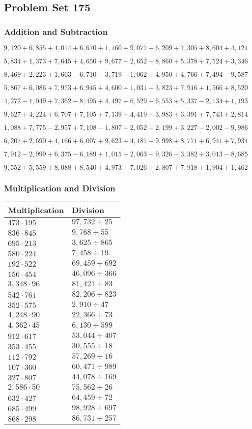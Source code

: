 \hypertarget{problem-set-175}{%
\subsection{Problem Set 175}\label{problem-set-175}}

\hypertarget{addition-and-subtraction}{%
\subsubsection{Addition and
Subtraction}\label{addition-and-subtraction}}

\(9,120+6,855+4,014+6,670+1,160+9,077+6,209+7,305+8,604+4,121\)

\(5,834+1,373+7,645+4,650+9,677+2,652+8,860+5,378+7,524+3,346\)

\(8,469+2,223+1,663-6,710-3,719-1,062+4,950+4,766+7,494-9,587\)

\(5,867+6,086+7,973+6,945+4,600+1,031+3,823+7,916+1,566+8,520\)

\(4,272-1,049+7,362-8,495+4,497+6,529-6,553+5,337-2,134+1,193\)

\(9,627+4,224+6,707+7,105+7,139+4,419+3,983+3,391+7,743+2,814\)

\(1,088+7,775-2,957+7,108-1,807+2,052+2,199+3,227-2,002-9,986\)

\(6,207+2,690+4,166+6,007+9,623+4,187+9,998+8,771+6,941+7,934\)

\(7,912-2,999+6,375-6,189+1,015+2,063+9,326-3,382+3,013-8,685\)

\(9,552+5,559+8,088+8,540+4,973+7,026+2,807+7,918+1,904+1,462\)

\hypertarget{multiplication-and-division}{%
\subsubsection{Multiplication and
Division}\label{multiplication-and-division}}

\begin{longtable}[]{@{}ll@{}}
\toprule
Multiplication & Division\tabularnewline
\midrule
\endhead
\(473\cdot195\) & \(97,732÷25\)\tabularnewline
\(836\cdot845\) & \(9,768÷55\)\tabularnewline
\(695\cdot213\) & \(3,625÷865\)\tabularnewline
\(580\cdot224\) & \(7,458÷19\)\tabularnewline
\(192\cdot522\) & \(69,459÷692\)\tabularnewline
\(156\cdot454\) & \(46,096÷366\)\tabularnewline
\(3,348\cdot96\) & \(81,421÷83\)\tabularnewline
\(542\cdot761\) & \(82,206÷823\)\tabularnewline
\(352\cdot575\) & \(2,910÷47\)\tabularnewline
\(4,248\cdot90\) & \(22,366÷73\)\tabularnewline
\(4,362\cdot45\) & \(6,130÷599\)\tabularnewline
\(912\cdot617\) & \(53,044÷407\)\tabularnewline
\(353\cdot455\) & \(30,555÷18\)\tabularnewline
\(112\cdot792\) & \(57,269÷16\)\tabularnewline
\(107\cdot360\) & \(60,471÷989\)\tabularnewline
\(327\cdot807\) & \(44,078÷169\)\tabularnewline
\(2,586\cdot50\) & \(75,562÷26\)\tabularnewline
\(632\cdot427\) & \(64,459÷72\)\tabularnewline
\(685\cdot499\) & \(98,928÷697\)\tabularnewline
\(868\cdot298\) & \(86,731÷257\)\tabularnewline
\bottomrule
\end{longtable}
